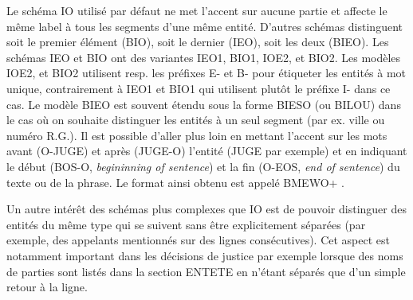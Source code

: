 Le schéma IO utilisé par défaut ne met l'accent sur aucune partie et affecte le même label à tous les segments d'une même entité. D'autres schémas distinguent soit le premier élément (BIO), soit le dernier (IEO), soit les deux (BIEO). Les schémas IEO et BIO ont des variantes IEO1, BIO1, IOE2, et BIO2. Les modèles IOE2, et BIO2 utilisent resp. les préfixes E- et B- pour étiqueter les entités à mot unique, contrairement à IEO1 et BIO1 qui utilisent plutôt le préfixe I- dans ce cas. Le modèle BIEO est souvent étendu sous la forme BIESO (ou BILOU) dans le cas où on souhaite distinguer les entités à un seul segment (par ex. ville ou numéro R.G.). Il est possible d'aller plus loin en mettant l'accent sur les mots avant  (O-JUGE) et après (JUGE-O) l'entité (JUGE par exemple) et en indiquant le début (BOS-O, \textit{begininning of sentence}) et la fin (O-EOS, \textit{end of sentence}) du texte ou de la phrase. Le format ainsi obtenu est appelé BMEWO+ \citep{baldwin2009bmewo}.

Un autre intérêt des schémas plus complexes que IO est de pouvoir distinguer des entités du même type qui se suivent sans être explicitement séparées (par exemple, des appelants mentionnés sur des lignes consécutives). Cet aspect est notamment important dans les décisions de justice par exemple lorsque des noms de parties sont listés dans la section ENTETE en n'étant séparés que d'un simple retour à la ligne.

